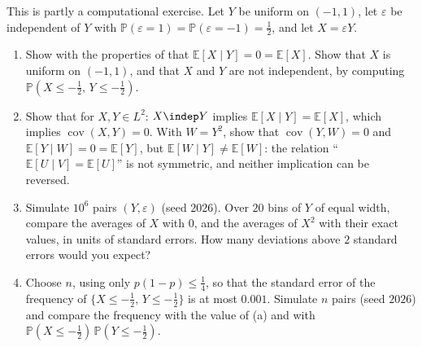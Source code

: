 \begin{exercise}\label{ex:cp-mean-independence}
\easy This is partly a computational exercise. Let $Y$ be uniform on $(-1,1)$, let $\varepsilon$ be
independent of $Y$ with $\mathbb P(\varepsilon=1)=\mathbb P(\varepsilon=-1)=\frac12$, and let
$X=\varepsilon Y$.
\begin{enumerate}[label=(\alph*)]
  \item Show with the properties of  that $\mathbb E[X\mid Y]=0=\mathbb E[X]$.
    Show that $X$ is uniform on $(-1,1)$, and that $X$ and $Y$ are not independent, by computing
    $\mathbb P(X\le-\frac12,\,Y\le-\frac12)$.
  \item Show that for $X,Y\in L^2$: $X\indep Y$ implies $\mathbb E[X\mid Y]=\mathbb E[X]$, which
    implies $\operatorname{cov}(X,Y)=0$. With $W=Y^2$, show that $\operatorname{cov}(Y,W)=0$ and
    $\mathbb E[Y\mid W]=0=\mathbb E[Y]$, but $\mathbb E[W\mid Y]\ne\mathbb E[W]$: the relation
    ``$\mathbb E[U\mid V]=\mathbb E[U]$'' is not symmetric, and neither implication can be reversed.
  \item Simulate $10^6$ pairs $(Y,\varepsilon)$ (seed $2026$). Over $20$ bins of $Y$ of equal
    width, compare the averages of $X$ with $0$, and the averages of $X^2$ with their exact values,
    in units of standard errors. How many deviations above $2$ standard errors would you expect?
  \item Choose $n$, using only $p(1-p)\le\frac14$, so that the standard error of the frequency of
    $\{X\le-\frac12,\,Y\le-\frac12\}$ is at most $0.001$. Simulate $n$ pairs (seed $2026$) and
    compare the frequency with the value of (a) and with $\mathbb P(X\le-\frac12)\,\mathbb P(Y\le-\frac12)$.
\end{enumerate}
\end{exercise}

